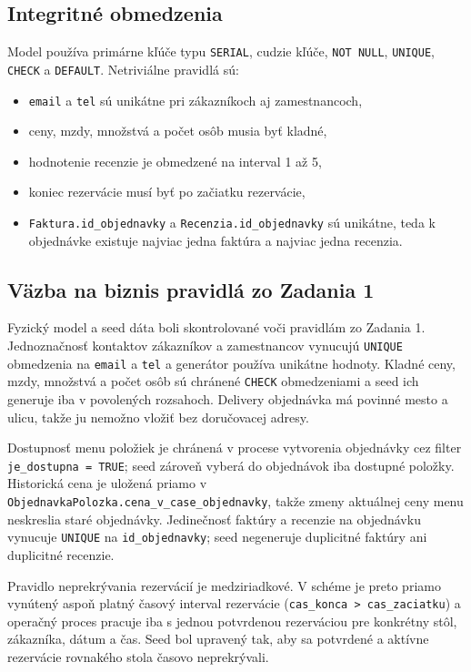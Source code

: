 \documentclass[11pt, a4paper]{article}
\begin{document}
\subsection*{Integritné obmedzenia}

Model používa primárne kľúče typu \texttt{SERIAL}, cudzie kľúče, \texttt{NOT NULL},
\texttt{UNIQUE}, \texttt{CHECK} a \texttt{DEFAULT}. Netriviálne pravidlá sú:
\begin{itemize}
    \item \texttt{email} a \texttt{tel} sú unikátne pri zákazníkoch aj zamestnancoch,
    \item ceny, mzdy, množstvá a počet osôb musia byť kladné,
    \item hodnotenie recenzie je obmedzené na interval 1 až 5,
    \item koniec rezervácie musí byť po začiatku rezervácie,
    \item \texttt{Faktura.id\_objednavky} a \texttt{Recenzia.id\_objednavky} sú unikátne, teda k objednávke existuje najviac jedna faktúra a najviac jedna recenzia.
\end{itemize}

\subsection*{Väzba na biznis pravidlá zo Zadania 1}

Fyzický model a seed dáta boli skontrolované voči pravidlám zo Zadania 1. Jednoznačnosť kontaktov
zákazníkov a zamestnancov vynucujú \texttt{UNIQUE} obmedzenia na \texttt{email} a \texttt{tel} a
generátor používa unikátne hodnoty. Kladné ceny, mzdy, množstvá a počet osôb sú chránené
\texttt{CHECK} obmedzeniami a seed ich generuje iba v povolených rozsahoch. Delivery objednávka má
povinné mesto a ulicu, takže ju nemožno vložiť bez doručovacej adresy.

Dostupnosť menu položiek je chránená v procese vytvorenia objednávky cez filter
\texttt{je\_dostupna = TRUE}; seed zároveň vyberá do objednávok iba dostupné položky. Historická cena
je uložená priamo v \texttt{ObjednavkaPolozka.cena\_v\_case\_objednavky}, takže zmeny aktuálnej ceny menu
neskreslia staré objednávky. Jedinečnosť faktúry a recenzie na objednávku vynucuje
\texttt{UNIQUE} na \texttt{id\_objednavky}; seed negeneruje duplicitné faktúry ani duplicitné recenzie.

Pravidlo neprekrývania rezervácií je medziriadkové. V schéme je preto priamo vynútený aspoň platný
časový interval rezervácie (\texttt{cas\_konca > cas\_zaciatku}) a operačný proces pracuje iba s jednou
potvrdenou rezerváciou pre konkrétny stôl, zákazníka, dátum a čas. Seed bol upravený tak, aby sa
potvrdené a aktívne rezervácie rovnakého stola časovo neprekrývali.
\end{document}
